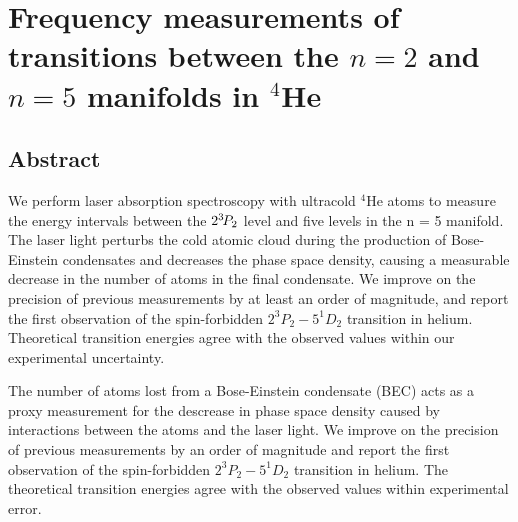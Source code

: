 





\chapter{Frequency measurements of transitions between the $n=2$ and $n=5$ manifolds in $^4$He}
\label{chap:transitions}

\section{Abstract}
We perform laser absorption spectroscopy with ultracold $^4$He atoms to measure the energy intervals between the $2^{3\!} P_2$ level and five levels in the n = 5 manifold.
	The laser light perturbs the cold atomic cloud during the production of Bose-Einstein condensates and decreases the phase space density, causing a measurable decrease in the number of atoms in the final condensate.
	We improve on the precision of previous measurements by at least an order of magnitude, and report the first observation of the spin-forbidden $2^{3\!}P_2 - 5^{1\!}D_2$ transition in helium.
	Theoretical transition energies agree with the observed values within our experimental uncertainty.

	The number of atoms lost from a Bose-Einstein condensate (BEC) acts as a proxy measurement for the descrease in phase space density caused by interactions between the atoms and the laser light.
	We improve on the precision of previous measurements by an order of magnitude and report the first observation of the spin-forbidden $2^{3\!}P_2 - 5^{1\!}D_2$ transition in helium.
	The theoretical transition energies agree with the observed values within experimental error.

